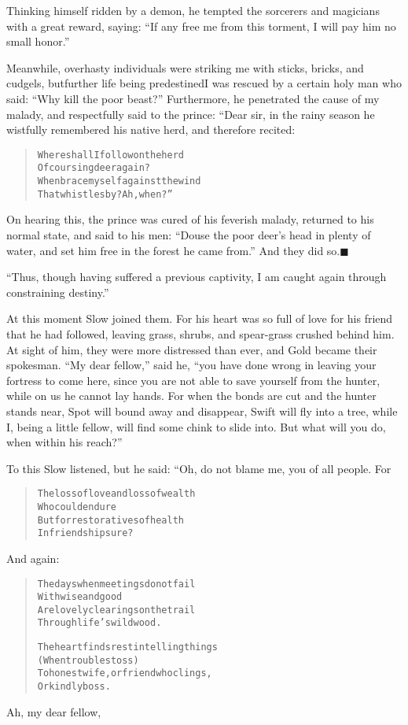 \documentclass[article, twoside, 14pt]{memoir}
\newcommand{\qed}{\hfill \ensuremath{\blacksquare}}
\renewenvironment{verbatim}{%
\begin{quote}%
\vskip -10pt%
\begin{alltt}\normalfont\large}{\end{alltt}%
\end{quote}%
\vskip -10pt
} %
\begin{document}
Thinking himself ridden by a demon, he tempted the sorcerers and
magicians with a great reward, saying:
``If any free me from this torment, I will pay him no small honor.''

Meanwhile, overhasty individuals were striking me with sticks,
bricks, and cudgels, but{\textemdash}further life being predestined{\textemdash}I was
rescued by a certain holy man who said:
``Why kill the poor beast?'' Furthermore, he penetrated the
cause of my malady, and respectfully said to the prince: “Dear sir,
in the rainy season he wistfully remembered his native herd, and
therefore recited:

\begin{verbatim}
Where shall I follow on the herd
    Of coursing deer again?
When brace myself against the wind
    That whistles by? Ah, when?”
\end{verbatim}
On hearing this, the prince was cured of his feverish malady,
returned to his normal state, and said to his men:
``Douse the poor deer's head in plenty of water, and set him free in the forest he came from.''
And they did so.\hyperref[s45]{\qed}

``Thus, though having suffered a previous captivity, I am caught again through constraining destiny.''

At this moment Slow joined them. For his heart was so full of love
for his friend that he had followed, leaving grass, shrubs, and
spear-grass crushed behind him. At sight of him, they were more
distressed than ever, and Gold became their spokesman.
``My dear fellow,'' said he,
``you have done wrong in leaving your fortress to come here, since you are not able to save yourself from the hunter, while on us he cannot lay hands. For when the bonds are cut and the hunter stands near, Spot will bound away and disappear, Swift will fly into a tree, while I, being a little fellow, will find some chink to slide into. But what will you do, when within his reach?''

To this Slow listened, but he said: “Oh, do not blame me, you of
all people. For

\begin{verbatim}
The loss of love and loss of wealth
    Who could endure
But for restoratives of health
    In friendship sure?
\end{verbatim}
And again:

\begin{verbatim}
The days when meetings do not fail
    With wise and good
Are lovely clearings on the trail
    Through life's wild wood.

The heart finds rest in telling things
    (When troubles toss)
To honest wife, or friend who clings,
    Or kindly boss.
\end{verbatim}
Ah, my dear fellow,
\end{document}
